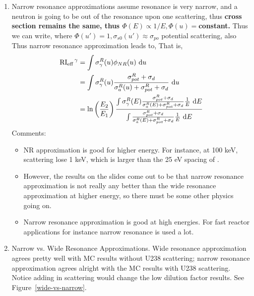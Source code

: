 \documentclass{school-22.211-notes}
\begin{document}
\begin{enumerate}
\item Narrow resonance approximations assume resonance is very narrow, and a neutron is going to be out of the resonance upon one scattering, thus \textbf{cross section remains the same, thus $\Phi(E) \propto 1/E, \Phi(u) = $constant.} Thus we can write, 
where $\Phi(u') = 1, \sigma_{s0} (u')\approx \sigma_{po}$ potential scattering, also 
Thus narrow resonance approximation leads to, 
That is, 
\begin{align}
\left. \mathrm{RI}_{\mathrm{eff}} \right.^{\gamma} &= \int \sigma_{\gamma}^R (u) \phi_{NR} (u) \mbox{ }\mathrm{d} u \\
&= \int \sigma_{\gamma}^R (u) \frac{\sigma_{pot}^R + \sigma_d}{\sigma_a^R(u) + \sigma_{pot}^R + \sigma_d} \mbox{ }\mathrm{d} u \\
&= \ln\left( \frac{E_2}{E_1} \right) \frac{ \int \sigma_{\gamma}^R (E) \frac{\sigma_{pot}^R + \sigma_d}{\sigma_{a}^R(E) + \sigma_{pot}^R + \sigma_d} \frac{1}{E} \mbox{ }\mathrm{d} E}{ \int \frac{\sigma_{pot}^R + \sigma_d}{\sigma_{a}^R(E) + \sigma_{pot}^R + \sigma_d} \frac{1}{E} \mbox{ }\mathrm{d} E}
\end{align}
Comments:
\begin{itemize}
\item NR approximation is good for higher energy. For instance, at 100 keV, scattering lose 1 keV, which is larger than the 25 eV spacing of . 

\item However, the results on the slides come out to be that narrow resonance approximation is not really any better than the wide resonance approximation at higher energy, so there must be some other physics going on. 

\item Narrow resonance approximation is good at high energies. For fast reactor applications for instance narrow resonance is used a lot. 
\end{itemize}

\item Narrow vs. Wide Resonance Approximations\label{narrow-wide-compr}. 
Wide resonance approximation agrees pretty well with MC results without U238 scattering; narrow resonance approximation agrees alright with the MC results with U238 scattering. Notice adding in scattering would change the low dilution factor results. See Figure~\ref{wide-vs-narrow}.


\end{enumerate}
\end{document}
